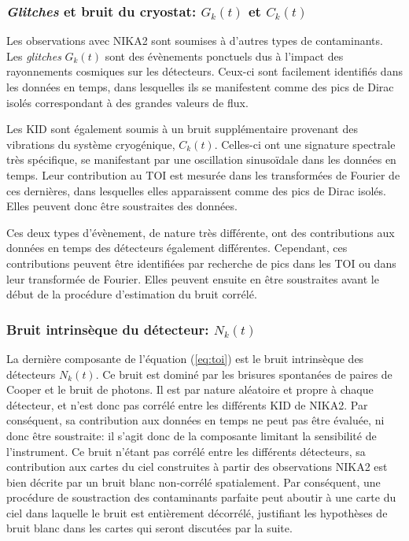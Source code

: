 \subsubsection{\textit{Glitches} et bruit du cryostat: $G_k(t)$ et $C_k(t)$} %
Les observations avec NIKA2 sont soumises à d'autres types de contaminants.
Les \textit{glitches} $G_k(t)$ sont des évènements ponctuels dus à l'impact des rayonnements cosmiques sur les détecteurs.
Ceux-ci sont facilement identifiés dans les données en temps, dans lesquelles ils se manifestent comme des pics de Dirac isolés correspondant à des grandes valeurs de flux.

Les KID sont également soumis à un bruit supplémentaire provenant des vibrations du système cryogénique, $C_k(t)$.
Celles-ci ont une signature spectrale très spécifique, se manifestant par une oscillation sinusoïdale dans les données en temps.
Leur contribution au TOI est mesurée dans les transformées de Fourier de ces dernières, dans lesquelles elles apparaissent comme des pics de Dirac isolés.
Elles peuvent donc être soustraites des données.

Ces deux types d'évènement, de nature très différente, ont des contributions aux données en temps des détecteurs également différentes.
Cependant, ces contributions peuvent être identifiées par recherche de pics dans les TOI ou dans leur transformée de Fourier.
Elles peuvent ensuite en être soustraites avant le début de la procédure d'estimation du bruit corrélé.

\subsubsection{Bruit intrinsèque du détecteur: $N_k(t)$} %
La dernière composante de l'équation (\ref{eq:toi}) est le bruit intrinsèque des détecteurs $N_k(t)$.
Ce bruit est dominé par les brisures spontanées de paires de Cooper et le bruit de photons.
Il est par nature aléatoire et propre à chaque détecteur, et n'est donc pas corrélé entre les différents KID de NIKA2.
Par conséquent, sa contribution aux données en temps ne peut pas être évaluée, ni donc être soustraite: il s'agit donc de la composante limitant la sensibilité de l'instrument.
Ce bruit n'étant pas corrélé entre les différents détecteurs, sa contribution aux cartes du ciel construites à partir des observations NIKA2 est bien décrite par un bruit blanc non-corrélé spatialement.
Par conséquent, une procédure de soustraction des contaminants parfaite peut aboutir à une carte du ciel dans laquelle le bruit est entièrement décorrélé, justifiant les hypothèses de bruit blanc dans les cartes qui seront discutées par la suite.

